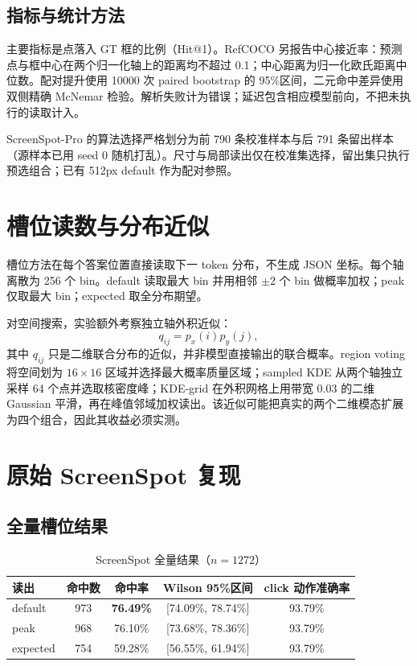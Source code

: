 \documentclass[UTF8,a4paper,11pt,fontset=none]{ctexart}
\begin{document}
\subsection{指标与统计方法}
主要指标是点落入 GT 框的比例（Hit@1）。RefCOCO 另报告中心接近率：预测点与框中心在两个归一化轴上的距离均不超过 0.1；中心距离为归一化欧氏距离中位数。配对提升使用 10000 次 paired bootstrap 的 95\%区间，二元命中差异使用双侧精确 McNemar 检验。解析失败计为错误；延迟包含相应模型前向，不把未执行的读取计入。

ScreenSpot-Pro 的算法选择严格划分为前 790 条校准样本与后 791 条留出样本（源样本已用 seed 0 随机打乱）。尺寸与局部读出仅在校准集选择，留出集只执行预选组合；已有 512px default 作为配对参照。

\section{槽位读数与分布近似}
槽位方法在每个答案位置直接读取下一 token 分布，不生成 JSON 坐标。每个轴离散为 256 个 bin。default 读取最大 bin 并用相邻 $\pm2$ 个 bin 做概率加权；peak 仅取最大 bin；expected 取全分布期望。

对空间搜索，实验额外考察独立轴外积近似：
\begin{equation}
  q_{ij}=p_x(i)p_y(j),
\end{equation}
其中 $q_{ij}$ 只是二维联合分布的近似，并非模型直接输出的联合概率。region voting 将空间划为 $16\times16$ 区域并选择最大概率质量区域；sampled KDE 从两个轴独立采样 64 个点并选取核密度峰；KDE-grid 在外积网格上用带宽 0.03 的二维 Gaussian 平滑，再在峰值邻域加权读出。该近似可能把真实的两个二维模态扩展为四个组合，因此其收益必须实测。

\section{原始 ScreenSpot 复现}
\subsection{全量槽位结果}
\begin{table}[H]
\centering\small
\caption{ScreenSpot 全量结果（$n=1272$）}
\begin{tabular}{lcccc}
\toprule
读出 & 命中数 & 命中率 & Wilson 95\%区间 & click 动作准确率 \\
\midrule
default & 973 & \textbf{76.49\%} & [74.09\%, 78.74\%] & 93.79\% \\
peak & 968 & 76.10\% & [73.68\%, 78.36\%] & 93.79\% \\
expected & 754 & 59.28\% & [56.55\%, 61.94\%] & 93.79\% \\
\bottomrule
\end{tabular}
\end{table}
\end{document}
